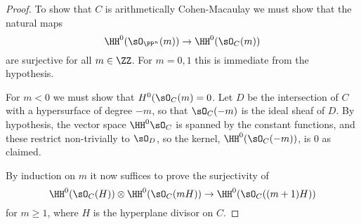 \begin{proof} 

To show that
$C$ is arithmetically Cohen-Macaulay we
must show that the natural maps 
$$
\HH^{0}(\sO_{\PP^{n}}(m)) \to \HH^{0}(\sO_{C}(m))
$$
are surjective for all $m\in \ZZ$. For $m=0,1$ this is immediate from the hypothesis.

For $m<0$ we must show that $H^0(\sO_C(m)=0$. Let $D$ be the intersection of $C$
with a hypersurface of degree $-m$, so that $\sO_C(-m)$ is the ideal sheaf of
$D$. By hypothesis, the vector space $\HH^{0}\sO_{C}$ is spanned by the constant functions, and these
restrict non-trivially to $\sO_{D}$, so the kernel, $\HH^{0}(\sO_{C}(-m))$, is 0 as claimed.

By induction on $m$ it now suffices to prove the surjectivity of
$$
\HH^{0}(\sO_{C}(H)) \otimes \HH^{0}(\sO_{C}(mH)) \to \HH^{0}(\sO_{C}((m+1)H))
$$
for $m\geq 1$, where $H$ is the hyperplane divisor on $C$.

%
%
%
%
 

\end{proof}
